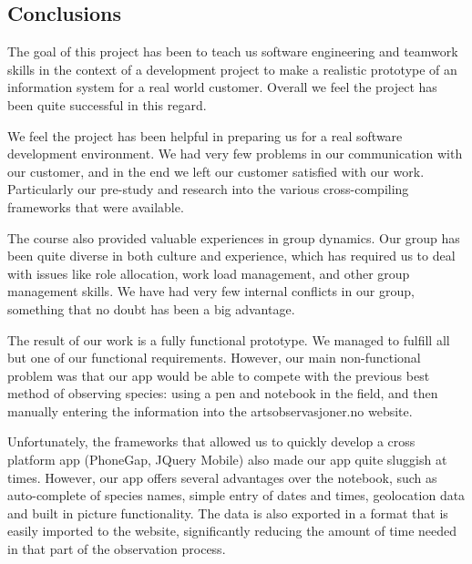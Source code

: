 \subsection{Conclusions}
The goal of this project has been to teach us software engineering and teamwork skills in the context of a development project to make a realistic prototype of an information system for a real world customer. Overall we feel the project has been quite successful in this regard.

We feel the project has been helpful in preparing us for a real software development environment. We had very few problems in our communication with our customer, and in the end we left our customer satisfied with our work. Particularly our pre-study and research into the various cross-compiling frameworks that were available.

The course also provided valuable experiences in group dynamics. Our group has been quite diverse in both culture and experience, which has required us to deal with issues like role allocation, work load management, and other group management skills. We have had very few internal conflicts in our group, something that no doubt has been a big advantage.


The result of our work is a fully functional prototype. We managed to fulfill all but one of our functional requirements. However, our main non-functional problem was that our app would be able to compete with the previous best method of observing species: using a pen and notebook in the field, and then manually entering the information into the artsobservasjoner.no website. 

Unfortunately, the frameworks that allowed us to quickly develop a cross platform app (PhoneGap, JQuery Mobile) also made our app quite sluggish at times. However, our app offers several advantages over the notebook, such as auto-complete of species names, simple entry of dates and times, geolocation data and built in picture functionality. The data is also exported in a format that is easily imported to the website, significantly reducing the amount of time needed in that part of the observation process. 

